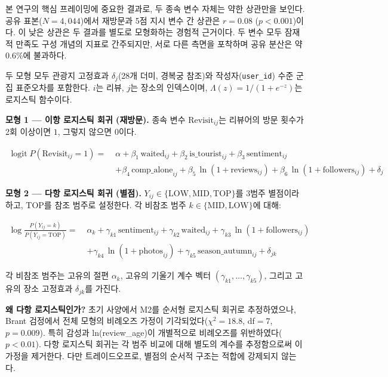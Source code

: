 \documentclass[10pt,a4paper]{article}
\newcommand{\subsect}[1]{\vspace{6pt}\noindent{\large\bfseries #1}\par\vspace{2pt}}
\begin{document}
본 연구의 핵심 프레이밍에 중요한 결과로, 두 종속 변수 자체는 약한
상관만을 보인다. 공유 표본($N = 4{,}044$)에서 재방문과 5점 지시
변수 간 상관은 $r = 0.08$ ($p < 0.001$)이다. 이 낮은 상관은 두 결과를
별도로 모형화하는 경험적 근거이다. 두 변수 모두 잠재적 만족도 구성
개념의 지표로 간주되지만, 서로 다른 측면을 포착하며 공유 분산은
약 0.6\%에 불과하다.

\subsect{3.5 모형}
두 모형 모두 관광지 고정효과 $\delta_j$(28개 더미, 경복궁 참조)와
작성자(\texttt{user\_id}) 수준 군집 표준오차를 포함한다. $i$는 리뷰,
$j$는 장소의 인덱스이며, $\Lambda(z) = 1/(1+e^{-z})$는 로지스틱 함수이다.

\textbf{모형 1 --- 이항 로지스틱 회귀 (재방문).} 종속 변수
$\text{Revisit}_{ij}$는 리뷰어의 방문 횟수가 2회 이상이면 $1$, 그렇지
않으면 $0$이다.

\begin{align*}
\operatorname{logit} P(\text{Revisit}_{ij} = 1)
   = \; &\alpha
       + \beta_{1}\,\text{waited}_{ij}
       + \beta_{2}\,\text{is\_tourist}_{ij}
       + \beta_{3}\,\text{sentiment}_{ij} \\
    &+ \beta_{4}\,\text{comp\_alone}_{ij}
       + \beta_{5}\,\ln(1 + \text{reviews}_{ij})
       + \beta_{6}\,\ln(1 + \text{followers}_{ij})
       + \delta_{j}
\end{align*}

\textbf{모형 2 --- 다항 로지스틱 회귀 (별점).} $Y_{ij} \in
\{\text{LOW}, \text{MID}, \text{TOP}\}$를 3범주 별점이라 하고,
TOP를 참조 범주로 설정한다. 각 비참조 범주 $k \in \{\text{MID},
\text{LOW}\}$에 대해:

\begin{align*}
\log\!\frac{P(Y_{ij} = k)}{P(Y_{ij} = \text{TOP})}
   = \; &\alpha_{k}
       + \gamma_{k1}\,\text{sentiment}_{ij}
       + \gamma_{k2}\,\text{waited}_{ij}
       + \gamma_{k3}\,\ln(1 + \text{followers}_{ij}) \\
    &+ \gamma_{k4}\,\ln(1 + \text{photos}_{ij})
       + \gamma_{k5}\,\text{season\_autumn}_{ij}
       + \delta_{jk}
\end{align*}

각 비참조 범주는 고유의 절편 $\alpha_k$, 고유의 기울기 계수 벡터
$(\gamma_{k1}, \ldots, \gamma_{k5})$, 그리고 고유의 장소 고정효과
$\delta_{jk}$를 가진다.

\textbf{왜 다항 로지스틱인가?} 초기 사양에서 M2를 순서형 로지스틱
회귀로 추정하였으나, Brant 검정에서 전체 모형의 비례오즈 가정이
기각되었다($\chi^2 = 18.8$, df$=7$, $p = 0.009$). 특히 감성과
ln(review\_age)이 개별적으로 비례오즈를 위반하였다($p < 0.01$).
다항 로지스틱 회귀는 각 범주 비교에 대해 별도의 계수를 추정함으로써
이 가정을 제거한다. 다만 트레이드오프로, 별점의 순서적 구조는 적합에
강제되지 않는다.
\end{document}
